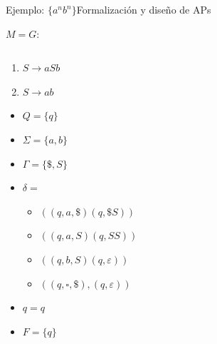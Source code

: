 \documentclass[spanish, handout]{beamer}
\begin{document}
\begin{frame}{Ejemplo: $\{a^nb^n\}$}{Formalización y diseño de APs}

    $M = G$:

    \begin{columns}
        \begin{column}{0.4\textwidth}
            \begin{enumerate}
                \item $S \to aSb$
                \item $S \to ab$
            \end{enumerate}

            \begin{itemize}
                \item $Q = \{q\}$
                \item $\Sigma = \{a, b\}$
                \item $\Gamma = \{\$, S\}$
                \item $\delta =$
                \begin{itemize}
                    \item $((q,a,\$)(q,\$S))$
                    \item $((q,a,S)(q,SS))$
                    \item $((q,b,S)(q,\varepsilon))$
                    \item $((q,\square,\$),(q,\varepsilon))$
                \end{itemize}
                \item $q = q$
                \item $F = \{q\}$
            \end{itemize}
        \end{column}
        \begin{column}{0.6\textwidth}
            \begin{center}
            \end{center}
        \end{column}
    \end{columns}
\end{frame}



% 
% 
\end{document}
